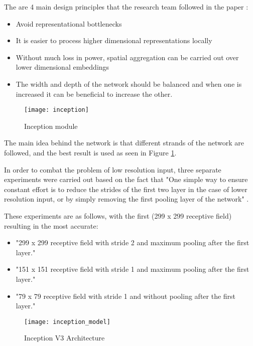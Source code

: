The are 4 main design principles that the research team followed in the paper \parencite{rethinkingInception}:
\begin{itemize}
    \item{Avoid representational bottlenecks}
    \item{It is easier to process higher dimensional representations locally}
    \item{Without much loss in power, spatial aggregation can be carried out over lower dimensional embeddings}
    \item{The width and depth of the network should be balanced and when one is increased it can be beneficial to increase the other.}
\end{itemize}

\begin{figure}[h]
    \centering
     \texttt{[image: inception]}
     \caption{Inception module \parencite{rethinkingInception}}
     \label{fig:inception}
\end{figure}

The main idea behind the network is that different strands of the network are followed, and the best result is used as seen in Figure \ref{fig:inception}.

In order to combat the problem of low resolution input, three separate experiments were carried out based on the fact that "One simple way to ensure constant effort is to reduce the strides of the first two layer in the case of lower resolution input, or by simply removing the first pooling layer of the network" \parencite{rethinkingInception}.

These experiments are as follows, with the first (299 x 299 receptive field) resulting in the most accurate:
\begin{itemize}
    \item{"299 x 299 receptive field with stride 2 and maximum pooling after the first layer." \parencite{rethinkingInception}}
    \item{"151 x 151 receptive field with stride 1 and maximum pooling after the first layer." \parencite{rethinkingInception}}
    \item{"79 x 79 receptive field with stride 1 and without pooling after the first layer." \parencite{rethinkingInception}}
\end{itemize}

\begin{sidewaysfigure}[h]
    \centering
     \texttt{[image: inception\_model]}
     \caption{Inception V3 Architecture \parencite{rethinkingInception}}
     \label{fig:inception_model}
\end{sidewaysfigure}

